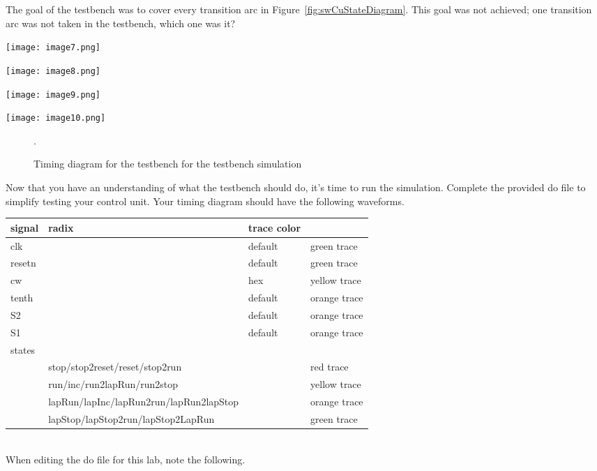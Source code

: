 The goal of the testbench was to cover every transition arc in Figure~\ref{fig:swCuStateDiagram}.
This goal was not achieved; one transition arc was not taken in the
testbench, which one was it?

\begin{landscape}

\texttt{[image: image7.png]}

\texttt{[image: image8.png]}


\texttt{[image: image9.png]}

\texttt{[image: image10.png]}
\begin{figure}
\caption{Timing diagram for the testbench for the testbench simulation}.
\label{fig:swCuSimTiming}
\end{figure}
\end{landscape}

Now that you have an understanding of what the testbench should do, it's
time to run the simulation. Complete the provided do file to simplify
testing your control unit. Your timing diagram should have the following
\hypertarget{swCuWaveform}{%
waveforms.
\label{swCuWaveform}}

\begin{tabular}{p{0.5cm}p{1.5cm}p{5cm}p{3cm}}
signal & radix & trace color \\ \hline
  clk 		& & default 		& green trace	\\ 
  resetn 	& & default 		& green trace	\\
  cw 		& & hex 		& yellow trace	\\
  tenth 	& & default 		& orange trace	\\
  S2 		& & default 		& orange trace	\\
  S1 		& & default 		& orange trace	\\
  states 	& &   		&			\\
 & stop/stop2reset/reset/stop2run 			& & red trace	\\ 
& run/inc/run2lapRun/run2stop 			& & yellow 	trace\\ 
& lapRun/lapInc/lapRun2run/lapRun2lapStop	& & orange  trace\\
& lapStop/lapStop2run/lapStop2LapRun   		&  & green  trace\\
\end{tabular}\\

When editing the do file for this lab, note the following.

